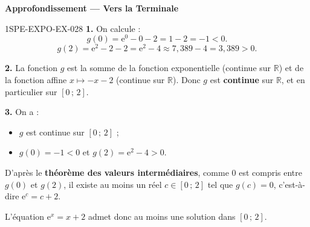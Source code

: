 \begin{center}\textbf{Approfondissement — Vers la Terminale}\end{center}
\begin{corrige}{1SPE-EXPO-EX-028}
\textbf{1.} On calcule :
\[g(0) = \mathrm{e}^0 - 0 - 2 = 1 - 2 = -1 < 0.\]
\[g(2) = \mathrm{e}^2 - 2 - 2 = \mathrm{e}^2 - 4 \approx 7{,}389 - 4 = 3{,}389 > 0.\]

\textbf{2.} La fonction $g$ est la somme de la fonction exponentielle (continue sur $\mathbb{R}$) et de la fonction affine $x \mapsto -x - 2$ (continue sur $\mathbb{R}$). Donc $g$ est \textbf{continue} sur $\mathbb{R}$, et en particulier sur $[0\,;\,2]$.

\textbf{3.} On a :
\begin{itemize}
  \item $g$ est continue sur $[0\,;\,2]$ ;
  \item $g(0) = -1 < 0$ et $g(2) = \mathrm{e}^2 - 4 > 0$.
\end{itemize}
D'après le \textbf{théorème des valeurs intermédiaires}, comme $0$ est compris entre $g(0)$ et $g(2)$, il existe au moins un réel $c \in [0\,;\,2]$ tel que $g(c) = 0$, c'est-à-dire $\mathrm{e}^c = c + 2$.

L'équation $\mathrm{e}^x = x + 2$ admet donc au moins une solution dans $[0\,;\,2]$.
\end{corrige}
